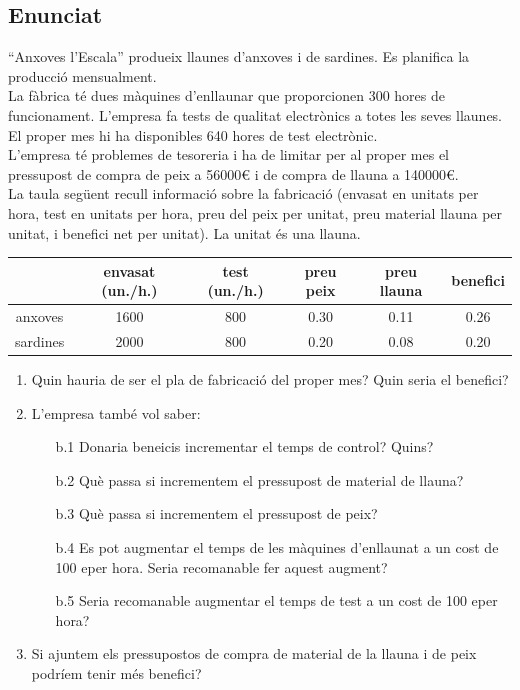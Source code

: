 \documentclass[a4paper, 11pt]{article}
\begin{document}
\subsection{Enunciat}
“Anxoves l’Escala” produeix llaunes d’anxoves i de sardines. Es planifica la producció mensualment.\\
La fàbrica té dues màquines d’enllaunar que proporcionen 300 hores de funcionament. L’empresa fa tests de qualitat electrònics a totes les seves llaunes. El proper mes hi ha disponibles
640 hores de test electrònic.\\
L’empresa té problemes de tesoreria i ha de limitar per al proper mes el pressupost de compra
de peix a 56000\euro\hspace{0.0625em} i de compra de llauna a 140000\euro.\\
La taula següent recull informació sobre la fabricació (envasat en unitats per hora, test en
unitats per hora, preu del peix per unitat, preu material llauna per unitat, i benefici net per
unitat). La unitat és una llauna.\\
\begin{table}[h]
    \centering
    \begin{tabular}{ c | c  c  c  c  c }
                 & envasat (un./h.) & test (un./h.) & preu peix & preu llauna & benefici \\ \hline
        anxoves  & 1600 & 800 & 0.30 & 0.11 & 0.26 \\
        sardines & 2000 & 800 & 0.20 & 0.08 & 0.20 \\
    \end{tabular}
\end{table}
\begin{enumerate}[label=(\alph*)]
    \item Quin hauria de ser el pla de fabricació del proper mes? Quin seria el benefici?
    \item L’empresa també vol saber:
    \begin{enumerate}
        \item[b.1] Donaria beneicis incrementar el temps de control? Quins?
        \item[b.2] Què passa si incrementem el pressupost de material de llauna?
        \item[b.3] Què passa si incrementem el pressupost de peix?
        \item[b.4] Es pot augmentar el temps de les màquines d’enllaunat a un cost de 100 eper hora. Seria recomanable fer aquest augment?
        \item[b.5] Seria recomanable augmentar el temps de test a un cost de 100 eper hora? 
    \end{enumerate}
    \item Si ajuntem els pressupostos de compra de material de la llauna i de peix podríem tenir
més benefici?
\end{enumerate}
\newpage
\end{document}
